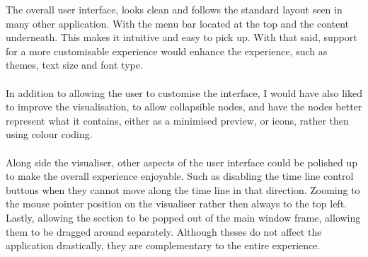 The overall user interface, looks clean and follows the standard layout seen in many other application. With the menu bar located at the top and the content underneath. This makes it intuitive and easy to pick up. With that said, support for a more customisable experience would enhance the experience, such as themes, text size and font type.
\\\\
In addition to allowing the user to customise the interface, I would have also liked to improve the visualisation, to allow collapsible nodes, and have the nodes better represent what it contains, either as a minimised preview, or icons, rather then using colour coding.
\\\\
Along side the visualiser, other aspects of the user interface could be polished up to make the overall experience enjoyable. Such as disabling the time line control buttons when they cannot move along the time line in that direction. Zooming to the mouse pointer position on the visualiser rather then always to the top left. Lastly, allowing the section to be popped out of the main window frame, allowing them to be dragged around separately. Although theses do not affect the application drastically, they are complementary to the entire experience.
